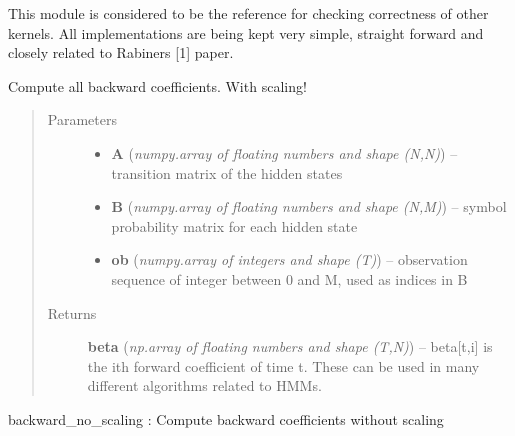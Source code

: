 \documentclass[letterpaper,10pt,english]{sphinxmanual}
\begin{document}
This module is considered to be the reference for checking correctness of other
kernels. All implementations are being kept very simple, straight forward and
closely related to Rabiners {[}1{]} paper.

\begin{fulllineitems}
\label{hmm:kernel.python.backward}
Compute all backward coefficients. With scaling!
\begin{quote}\begin{description}
\item[{Parameters}] \leavevmode\begin{itemize}
\item {} 
\textbf{A} (\emph{numpy.array of floating numbers and shape (N,N)}) --
transition matrix of the hidden states

\item {} 
\textbf{B} (\emph{numpy.array of floating numbers and shape (N,M)}) --
symbol probability matrix for each hidden state

\item {} 
\textbf{ob} (\emph{numpy.array of integers and shape (T)}) --
observation sequence of integer between 0 and M, used as indices in B

\end{itemize}

\item[{Returns}] \leavevmode
\textbf{beta} (\emph{np.array of floating numbers and shape (T,N)}) --
beta{[}t,i{]} is the ith forward coefficient of time t. These can be
used in many different algorithms related to HMMs.

\end{description}\end{quote}




backward\_no\_scaling : Compute backward coefficients without scaling



\end{fulllineitems}

\end{document}
